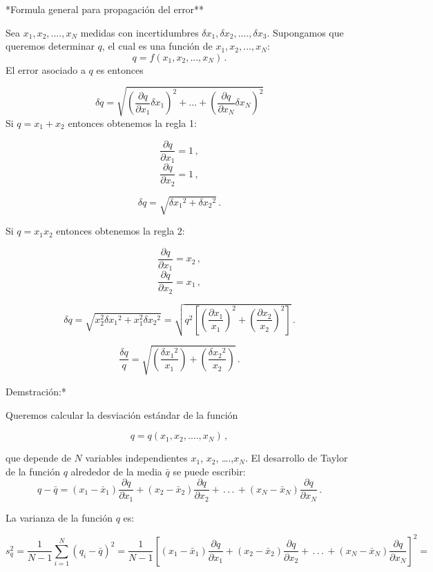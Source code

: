 \documentclass[
]{agujournal2019}
\begin{document}
\vspace{0.5cm}

\noindent **Formula general para propagación del error**

\noindent Sea \(x_1, x_2,....,x_N\) medidas con incertidumbres
\(\delta{x_1},\delta{x_2},....,\delta{x_3}\). Supongamos que queremos
determinar \(q\), el cual es una función de \(x_1,x_2,...,x_N\):
\[q=f(x_1, x_2,...,x_N)\,.\] El error asociado a \(q\) es entonces

\[\delta{q}=\sqrt{\left( \frac{\partial{q}}{\partial{x_1}}\delta{x_1}\right)^2 + ... +
                  \left( \frac{\partial{q}}{\partial{x_N}}\delta{x_N}\right)^2}\]
\noindent Si \(q=x_1+x_2\) entonces obtenemos la regla 1:

\[\frac{\partial{q}}{\partial{x_1}}=1\,,\]
\[\frac{\partial{q}}{\partial{x_2}}=1\,,\]

\[\delta{q}=\sqrt{\delta{x_1}^2 + \delta{x_2}^2}\,.\]

\noindent Si \(q=x_1x_2\) entonces obtenemos la regla 2:

\[\frac{\partial{q}}{\partial{x_1}}=x_2\,,\]
\[\frac{\partial{q}}{\partial{x_2}}=x_1\,,\]

\[\delta{q}=\sqrt{x^2_2\delta{x_1}^2 + x^2_1\delta{x_2}^2}=\sqrt{q^2\left[ \left(\frac{\partial{x_1}}{x_1}\right)^2 + \left(\frac{\partial{x_2}}{x_2}\right)^2\right]}\,.\]

\[\frac{\delta{q}}{q}=\sqrt{\left(\frac{\delta{x_1}^2}{x_1}\right) + \left(\frac{\delta{x_2}^2}{x_2}\right)}\,.\]

\vspace{0.5cm}

\noindent *Demstración:*

\noindent Queremos calcular la desviación estándar de la función

\[q=q(x_1, x_2,....,x_N)\,,\]

que depende de \(N\) variables independientes \(x_1\), \(x_2\),
\ldots.,\(x_N\). El desarrollo de Taylor de la función \(q\) alrededor
de la media \(\bar{q}\) se puede escribir:
\[q - \bar{q}=\left(x_1 - \bar{x}_1\right)\frac{\partial{q}}{\partial{x_1}} +
                          \left(x_2 - \bar{x}_2\right)\frac{\partial{q}}{\partial{x_2}}+  \,.\,.\,.\,
                          + \left(x_N - \bar{x}_N\right)\frac{\partial{q}}{\partial{x_N}}\,.\]

\noindent La varianza de la función \(q\) es:

\[s^2_q=\frac{1}{N-1}\sum\limits^N_{i=1}\left( q_i-\bar{q} \right)^2=
               \frac{1}{N-1}\left[
               \left(x_1 - \bar{x}_1\right)\frac{\partial{q}}{\partial{x_1}} +
               \left(x_2 - \bar{x}_2\right)\frac{\partial{q}}{\partial{x_2}} +
              \,.\,.\,.\, +
               \left(x_N - \bar{x}_N\right)\frac{\partial{q}}{\partial{x_N}}
               \right]^2=\]
\end{document}
